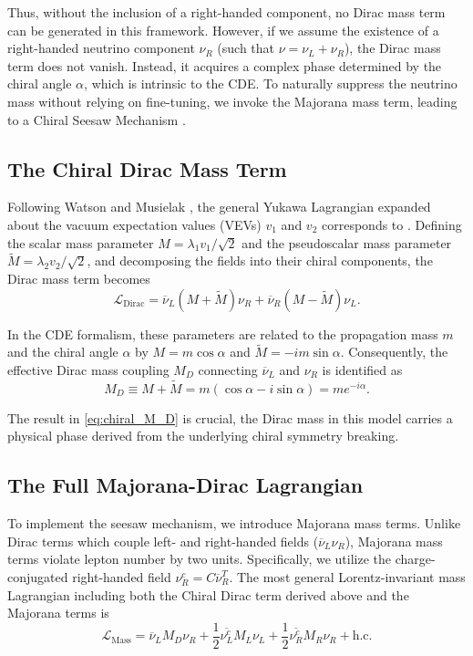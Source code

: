 Thus, without the inclusion of a right-handed component, no Dirac mass term can
be generated in this framework. However, if we assume the existence of a
right-handed neutrino component $\nu_R$ (such that $\nu = \nu_L + \nu_R$), the
Dirac mass term does not vanish. Instead, it acquires a complex phase determined
by the chiral angle $\alpha$, which is intrinsic to the CDE. To naturally
suppress the neutrino mass without relying on fine-tuning, we invoke the
Majorana mass term, leading to a Chiral Seesaw Mechanism \cite{peskinIntroductionQuantumField2019}.


\subsection{The Chiral Dirac Mass Term}

Following Watson and Musielak \cite{watsonChiralSymmetryDirac2020},
the general Yukawa Lagrangian expanded about the vacuum expectation values
(VEVs) $v_1$ and $v_2$ corresponds to . Defining the
scalar mass parameter $M = \lambda_1 v_1 / \sqrt{2}$ and the pseudoscalar mass
parameter $\tilde{M} = \lambda_2 v_2 / \sqrt{2}$, and decomposing the fields
into their chiral components, the Dirac mass term
becomes
\begin{equation}
  \mathcal{L}_{\text{Dirac}} = \overline{\nu}_L \left(M + \tilde{M}\right)
  \nu_R + \overline{\nu}_R \left(M - \tilde{M}\right) \nu_L.
\end{equation}

In the CDE formalism, these parameters are related to the propagation mass $m$
and the chiral angle $\alpha$ by $M = m \cos \alpha$ and $\tilde{M} = -im \sin
\alpha$. Consequently, the effective Dirac mass coupling $M_D$ connecting
$\overline{\nu}_L$ and $\nu_R$ is identified as
\begin{equation} \label{eq:chiral_M_D}
  M_D \equiv M + \tilde{M} = m\left(\cos \alpha - i \sin \alpha\right) = m
  e^{-i\alpha}.
\end{equation}

The result in \eqref{eq:chiral_M_D} is crucial, the Dirac mass in this model
carries a physical phase derived from the underlying chiral symmetry breaking.

\subsection{The Full Majorana-Dirac Lagrangian}

To implement the seesaw mechanism, we introduce Majorana mass terms. Unlike
Dirac terms which couple left- and right-handed fields ($\overline{\nu}_L
\nu_R$), Majorana mass terms violate lepton number by two units. Specifically,
we utilize the charge-conjugated right-handed field $\nu_R^c =
C\overline{\nu}_R^T$. The most general Lorentz-invariant mass Lagrangian
including both the Chiral Dirac term derived above and the Majorana terms is
\begin{equation} \label{eq:L_mass_full}
  \mathcal{L}_{\text{Mass}}
  =
  \overline{\nu}_L M_D \nu_R
  +
  \frac{1}{2}\overline{\nu_L^c} M_L \nu_L
  +
  \frac{1}{2}\overline{\nu_R^c} M_R \nu_R
  +\text{h.c.}
\end{equation}


